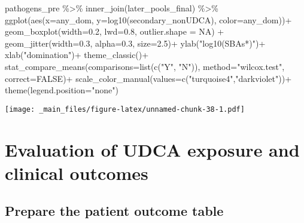 \documentclass[
]{book}
\newenvironment{Shaded}{\begin{snugshade}}{\end{snugshade}}
\newcommand{\AttributeTok}[1]{\textcolor[rgb]{0.77,0.63,0.00}{#1}}
\newcommand{\ConstantTok}[1]{\textcolor[rgb]{0.00,0.00,0.00}{#1}}
\newcommand{\FloatTok}[1]{\textcolor[rgb]{0.00,0.00,0.81}{#1}}
\newcommand{\FunctionTok}[1]{\textcolor[rgb]{0.00,0.00,0.00}{#1}}
\newcommand{\NormalTok}[1]{#1}
\newcommand{\SpecialCharTok}[1]{\textcolor[rgb]{0.00,0.00,0.00}{#1}}
\newcommand{\StringTok}[1]{\textcolor[rgb]{0.31,0.60,0.02}{#1}}
\begin{document}
\begin{Shaded}
\begin{Highlighting}[]
\NormalTok{pathogens\_pre }\SpecialCharTok{\%\textgreater{}\%} \FunctionTok{inner\_join}\NormalTok{(later\_pools\_final) }\SpecialCharTok{\%\textgreater{}\%} 
  \FunctionTok{ggplot}\NormalTok{(}\FunctionTok{aes}\NormalTok{(}\AttributeTok{x=}\NormalTok{any\_dom, }\AttributeTok{y=}\FunctionTok{log10}\NormalTok{(secondary\_nonUDCA), }\AttributeTok{color=}\NormalTok{any\_dom))}\SpecialCharTok{+}
   \FunctionTok{geom\_boxplot}\NormalTok{(}\AttributeTok{width=}\FloatTok{0.2}\NormalTok{, }\AttributeTok{lwd=}\FloatTok{0.8}\NormalTok{, }\AttributeTok{outlier.shape =} \ConstantTok{NA}\NormalTok{) }\SpecialCharTok{+}
  \FunctionTok{geom\_jitter}\NormalTok{(}\AttributeTok{width=}\FloatTok{0.3}\NormalTok{, }\AttributeTok{alpha=}\FloatTok{0.3}\NormalTok{, }\AttributeTok{size=}\FloatTok{2.5}\NormalTok{)}\SpecialCharTok{+}
  \FunctionTok{ylab}\NormalTok{(}\StringTok{"log10(SBAs*)"}\NormalTok{)}\SpecialCharTok{+}
  \FunctionTok{xlab}\NormalTok{(}\StringTok{"domination"}\NormalTok{)}\SpecialCharTok{+}
  \FunctionTok{theme\_classic}\NormalTok{()}\SpecialCharTok{+}
  \FunctionTok{stat\_compare\_means}\NormalTok{(}\AttributeTok{comparisons=}\FunctionTok{list}\NormalTok{(}\FunctionTok{c}\NormalTok{(}\StringTok{"Y"}\NormalTok{, }\StringTok{"N"}\NormalTok{)),}
                     \AttributeTok{method=}\StringTok{"wilcox.test"}\NormalTok{,}
                     \AttributeTok{correct=}\ConstantTok{FALSE}\NormalTok{)}\SpecialCharTok{+}
  \FunctionTok{scale\_color\_manual}\NormalTok{(}\AttributeTok{values=}\FunctionTok{c}\NormalTok{(}\StringTok{"turquoise4"}\NormalTok{,}\StringTok{"darkviolet"}\NormalTok{))}\SpecialCharTok{+}
  \FunctionTok{theme}\NormalTok{(}\AttributeTok{legend.position=}\StringTok{"none"}\NormalTok{)}
\end{Highlighting}
\end{Shaded}

\texttt{[image: \_main\_files/figure-latex/unnamed-chunk-38-1.pdf]}

\hypertarget{evaluation-of-udca-exposure-and-clinical-outcomes}{%
\chapter{Evaluation of UDCA exposure and clinical outcomes}\label{evaluation-of-udca-exposure-and-clinical-outcomes}}

\hypertarget{prepare-the-patient-outcome-table}{%
\section{Prepare the patient outcome table}\label{prepare-the-patient-outcome-table}}
\end{document}
